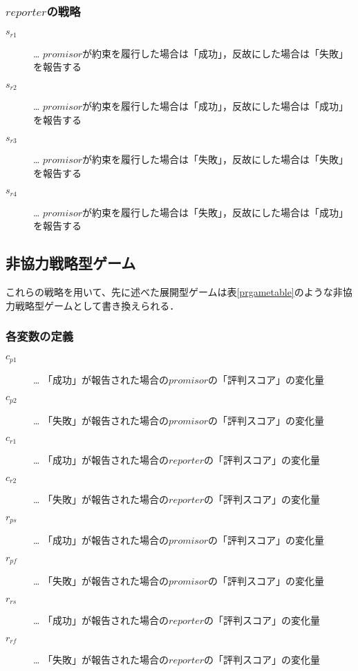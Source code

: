\subsubsection{$reporter$の戦略}
\begin{description}
  \item[$s_{r1}$]… $promisor$が約束を履行した場合は「成功」，反故にした場合は「失敗」を報告する
  \item[$s_{r2}$]… $promisor$が約束を履行した場合は「成功」，反故にした場合は「成功」を報告する
  \item[$s_{r3}$]… $promisor$が約束を履行した場合は「失敗」，反故にした場合は「失敗」を報告する
  \item[$s_{r4}$]… $promisor$が約束を履行した場合は「失敗」，反故にした場合は「成功」を報告する
\end{description}

\subsection{非協力戦略型ゲーム}
これらの戦略を用いて、先に述べた展開型ゲームは表\ref{prgametable}のような非協力戦略型ゲームとして書き換えられる．


\subsubsection{各変数の定義}
\begin{description}
  \item[$c_{p1}$]… 「成功」が報告された場合の$promisor$の「評判スコア」の変化量
  \item[$c_{p2}$]… 「失敗」が報告された場合の$promisor$の「評判スコア」の変化量
  \item[$c_{r1}$]… 「成功」が報告された場合の$reporter$の「評判スコア」の変化量
  \item[$c_{r2}$]… 「失敗」が報告された場合の$reporter$の「評判スコア」の変化量
  \item[$r_{ps}$]… 「成功」が報告された場合の$promisor$の「評判スコア」の変化量
  \item[$r_{pf}$]… 「失敗」が報告された場合の$promisor$の「評判スコア」の変化量
  \item[$r_{rs}$]… 「成功」が報告された場合の$reporter$の「評判スコア」の変化量
  \item[$r_{rf}$]… 「失敗」が報告された場合の$reporter$の「評判スコア」の変化量
\end{description}

